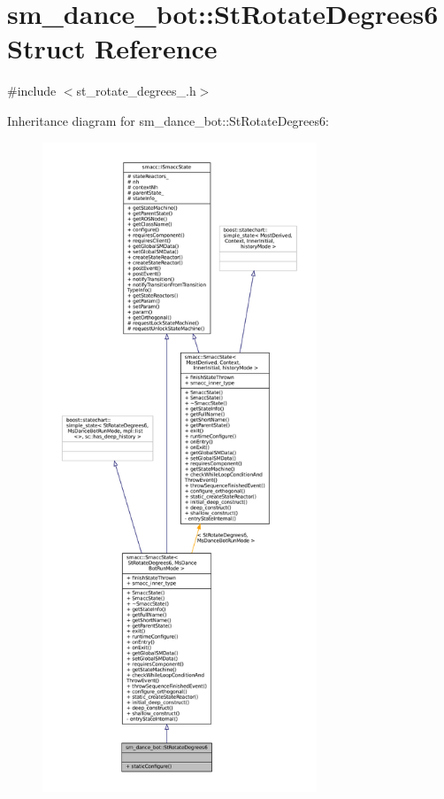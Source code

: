 \hypertarget{structsm__dance__bot_1_1StRotateDegrees6}{}\section{sm\+\_\+dance\+\_\+bot\+:\+:St\+Rotate\+Degrees6 Struct Reference}
\label{structsm__dance__bot_1_1StRotateDegrees6}


{\ttfamily \#include $<$st\+\_\+rotate\+\_\+degrees\+\_.\+h$>$}



Inheritance diagram for sm\+\_\+dance\+\_\+bot\+:\+:St\+Rotate\+Degrees6\+:
\nopagebreak
\begin{figure}[H]
\begin{center}
\leavevmode
\includegraphics[height=550pt]{structsm__dance__bot_1_1StRotateDegrees6__inherit__graph}
\end{center}
\end{figure}



